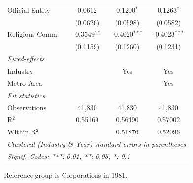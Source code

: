 \documentclass[
  12pt]{article}
\begin{document}
\begin{table}
\begin{minipage}{\linewidth}
\begin{tabular}{lccc}
   Official Entity   & 0.0612         & 0.1200$^{*}$    & 0.1263$^{*}$\\   
                     & (0.0626)       & (0.0598)        & (0.0582)\\   
   Religious Comm.   & -0.3549$^{**}$ & -0.4020$^{***}$ & -0.4023$^{***}$\\   
                     & (0.1159)       & (0.1260)        & (0.1231)\\   
   \midrule
   \emph{Fixed-effects}\\
   Industry          &                & Yes             & Yes\\  
   Metro Area        &                &                 & Yes\\  
   \midrule
   \emph{Fit statistics}\\
   Observations      & 41,830         & 41,830          & 41,830\\  
   R$^2$             & 0.55169        & 0.56490         & 0.57002\\  
   Within R$^2$      &                & 0.51876         & 0.52096\\  
   \midrule \midrule
   \multicolumn{4}{l}{\emph{Clustered (Industry \& Year) standard-errors in parentheses}}\\
   \multicolumn{4}{l}{\emph{Signif. Codes: ***: 0.01, **: 0.05, *: 0.1}}\\
\end{tabular}

\end{minipage}%
\newline
\begin{minipage}{\linewidth}

\par \raggedright

\end{minipage}%
\newline
\begin{minipage}{\linewidth}

Reference group is Corporations in 1981.

\end{minipage}%
\newline
\begin{minipage}{\linewidth}

\par\endgroup

\end{minipage}%

\end{table}%
\end{document}
